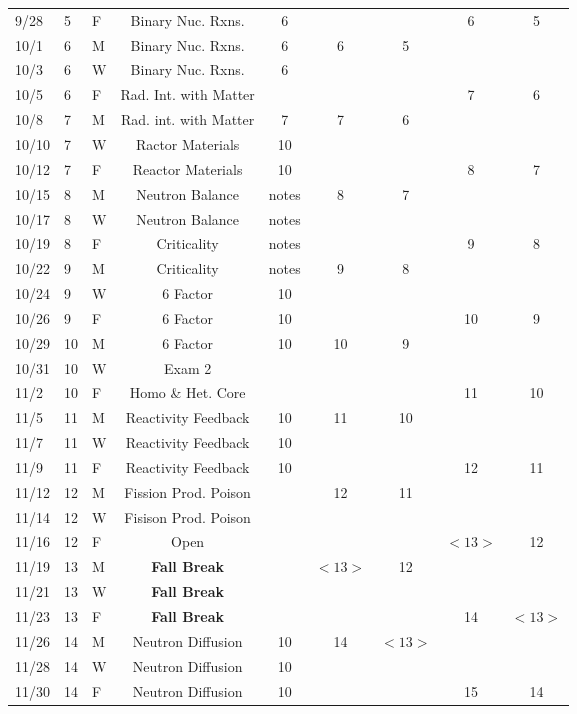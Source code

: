 \documentclass[11pt, a4paper]{article}
\begin{document}
\begin{table}[h]
\begin{center}
\begin{tabular}{lllcccccc}
9/28 & 5 & F & Binary Nuc. Rxns.  & 6 &  &  & 6 & 5 \\
10/1 & 6 & M & Binary Nuc. Rxns.  & 6 & 6 & 5 &  &  \\
10/3 & 6 & W & Binary Nuc. Rxns.  & 6 &  &  &  &  \\
10/5 & 6 & F & Rad. Int. with Matter  &  &  &  & 7 & 6 \\
10/8 & 7 & M & Rad. int. with Matter & 7 & 7 & 6 &  &  \\
10/10 & 7 & W & Ractor Materials  & 10 &  &  &  &  \\
10/12 & 7 & F & Reactor Materials  & 10 &  &  & 8 & 7 \\
10/15 & 8 & M & Neutron Balance  & notes &  8 & 7 &  &  \\
10/17 & 8 & W & Neutron Balance  & notes &  &  &  &  \\
10/19 & 8 & F & Criticality  & notes &  &  & 9 & 8 \\
10/22 & 9 & M & Criticality  & notes & 9 & 8 &  &  \\
10/24 & 9 & W & 6 Factor  & 10 &  &  &  &  \\
10/26 & 9 & F & 6 Factor  & 10 &  &  & 10 & 9 \\
10/29 & 10 & M & 6 Factor  & 10 & 10 & 9 &  & \\
10/31 & 10 & W & Exam 2  &  &  &  &  &  \\
11/2 & 10 & F & Homo \& Het. Core   &     &    &    &  11  & 10  \\
11/5 & 11 & M & Reactivity Feedback & 10  & 11 & 10 &  &  \\
11/7 & 11 & W & Reactivity Feedback  & 10 &  &  &  &  \\
11/9 & 11 & F & Reactivity Feedback  & 10 &  &  & 12 & 11 \\
11/12 & 12 & M & Fission Prod. Poison &  & 12 & 11 &  &  \\
11/14 & 12 & W & Fisison Prod. Poison  &  &  &  &  &  \\
11/16 & 12 & F & Open &  &  &  &  $<13>$ & 12 \\
11/19 & 13 & M & \textbf{Fall Break}& & $<13>$ & 12 &  &  \\
11/21 & 13 & W & \textbf{Fall Break}  &  &  &  &  &  \\
11/23 & 13 & F & \textbf{Fall Break}  &  &  &  & 14 & $<13>$ \\
11/26 & 14 & M & Neutron Diffusion& 10&14& $<13>$ &  & \\
11/28 & 14 & W & Neutron Diffusion  & 10 &  &  &  &  \\
11/30 & 14 & F & Neutron Diffusion  & 10  &  &  & 15 & 14 \\

\end{tabular}
\end{center}
\end{table}
\end{document}
